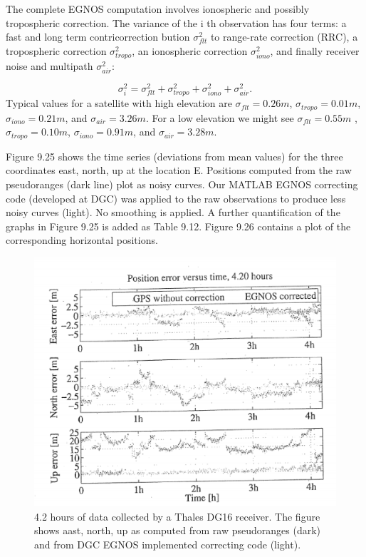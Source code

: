 		The complete EGNOS computation involves ionospheric and possibly tropospheric correction. The variance of the i th observation has four terms: a fast and long term contricorrection bution $\sigma^2_{flt}$ to range-rate correction (RRC), a tropospheric correction $\sigma^2_{tropo}$, an ionospheric correction $\sigma^2_{iono}$, and finally receiver noise and multipath $\sigma^2_{air}$:

		\begin{equation}\label{eq:9.70}
			\sigma^2_i = \sigma^2_{flt} + \sigma^2_{tropo} + \sigma^2_{iono} + \sigma^2_{air}.
		\end{equation}
		Typical values for a satellite with high elevation are $\sigma_{flt} = 0.26 m $, $\sigma_{tropo} = 0.01 m$, $\sigma_{iono} = 0.21 m$, and $\sigma_{air} = 3.26 m $. For a low elevation we might see $\sigma_{flt} = 0.55 m$ , $\sigma_{tropo} = 0.10 m$, $\sigma_{iono} = 0.91m$, and $\sigma_{air} = 3.28m$.

		Figure 9.25 shows the time series (deviations from mean values) for the three coordinates east, north, up at the location E. Positions computed from the raw pseudoranges (dark line) plot as noisy curves. Our MATLAB EGNOS correcting code (developed at DGC) was applied to the raw observations to produce less noisy curves (light). No smoothing is applied. A further quantification of the graphs in Figure 9.25 is added as Table 9.12. Figure 9.26 contains a plot of the corresponding horizontal positions.
	
		\begin{figure}
			\centering
			\includegraphics[width=0.7\linewidth]{TeX_files/Part03/chapter09/image/9-25}
			\caption{4.2 hours of data collected by a Thales DG16 receiver. The figure shows aast, north, up as computed from raw pseudoranges (dark) and from DGC EGNOS implemented correcting code (light).}
			\label{fig:9-25}
		\end{figure}
		
